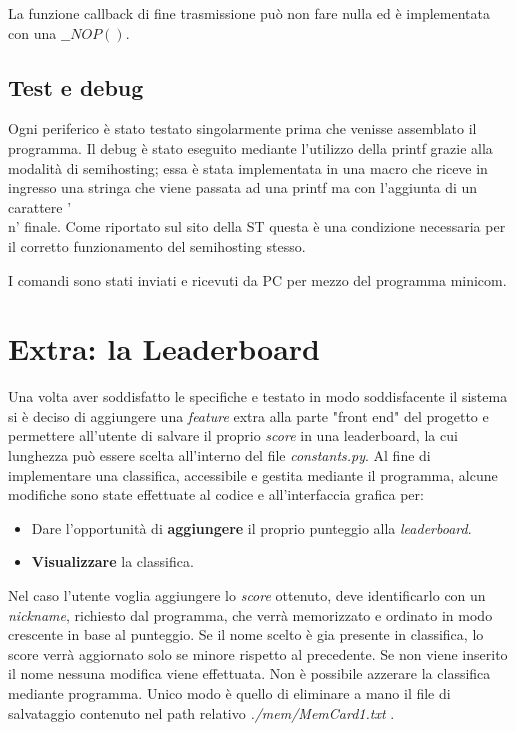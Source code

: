 \documentclass[a4paper]{article}
\begin{document}
		La funzione callback di fine trasmissione può non fare nulla ed è implementata con una \textbf{$\_\_NOP()$}.

	\subsection{Test e debug}
		Ogni periferico è stato testato singolarmente prima che venisse assemblato il programma. Il debug è stato eseguito mediante l'utilizzo della printf grazie alla modalità di semihosting; essa è stata implementata in una macro che riceve in ingresso una stringa che viene passata ad una printf ma con l'aggiunta di un carattere '\\n' finale. Come riportato sul sito della ST questa è una condizione necessaria per il corretto funzionamento del semihosting stesso. 

		I comandi sono stati inviati e ricevuti da PC per mezzo del programma minicom.
\section{Extra: la Leaderboard}
		Una volta aver soddisfatto le specifiche e testato in modo soddisfacente il sistema si è deciso di aggiungere una \textit{feature} extra alla parte "front end" del progetto e permettere all'utente di salvare il proprio \textit{score} in una leaderboard, la cui lunghezza può essere scelta all'interno del file \textit{constants.py}. \newline
		Al fine di implementare una classifica, accessibile e gestita mediante il programma, alcune modifiche sono state effettuate al codice e all'interfaccia grafica per:
		\begin{itemize}
			\item Dare l'opportunità di \textbf{aggiungere} il proprio punteggio alla \textit{leaderboard}.
			\item \textbf{Visualizzare} la classifica.
		\end{itemize}
		Nel caso l'utente voglia aggiungere lo \textit{score} ottenuto, deve identificarlo con un \textit{nickname}, richiesto dal programma, che verrà memorizzato e ordinato in modo crescente in base al punteggio. Se il nome scelto è gia presente in classifica, lo score verrà aggiornato solo se minore rispetto al precedente. Se non viene inserito il nome nessuna modifica viene effettuata.\newline
		Non è possibile azzerare la classifica mediante programma. Unico modo è quello di eliminare a mano il file di salvataggio contenuto nel path relativo \textit{./mem/MemCard1.txt} .
\end{document}
